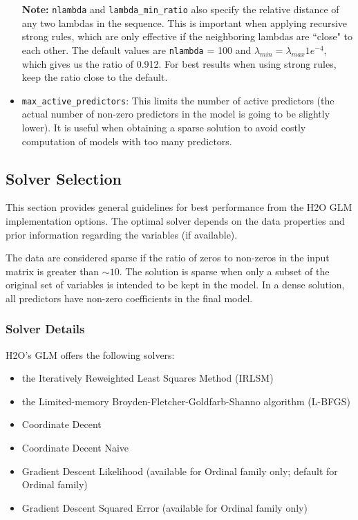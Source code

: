 \begin{itemize}
\textbf{Note:} \texttt{nlambda} and \texttt{lambda\_min\_ratio} also specify the relative distance of any two
 lambdas in the sequence. This is important when applying recursive strong rules, which are only effective if the neighboring lambdas are ``close" to each other. The default values are \texttt{nlambda} = 100 and $\lambda_{min}
= \lambda_{max} 1e^{-4}$, which gives us the ratio of 0.912.  For best results when using strong rules, keep the
ratio close to the default.

\item \texttt{max\_active\_predictors}: This limits the number of active predictors (the actual number of non-zero predictors in the model is going to be slightly lower). It is useful when obtaining a sparse solution to avoid costly computation of models with too many predictors.

\end{itemize}

\newpage
\subsection{Solver Selection}

This section provides general guidelines for best performance from the H2O GLM implementation options. The optimal solver depends on the data properties and prior information regarding the variables (if available). 

The data are considered sparse if the ratio of zeros to non-zeros in the input matrix is greater than $\sim 10$. The solution is sparse when only a subset of the original set of variables is intended to be kept in the model. In a dense solution, all predictors have non-zero coefficients in the final model.  

\subsubsection{Solver Details}
H2O's GLM offers the following solvers: 

\begin{itemize}
\item the Iteratively Reweighted Least Squares Method (IRLSM)
\item the Limited-memory Broyden-Fletcher-Goldfarb-Shanno algorithm (L-BFGS)
\item Coordinate Decent
\item Coordinate Decent Naive
\item Gradient Descent Likelihood (available for Ordinal family only; default for Ordinal family)
\item Gradient Descent Squared Error (available for Ordinal family only)
\end{itemize}

